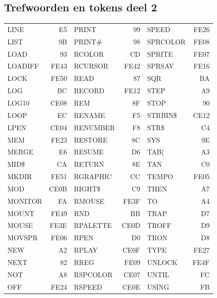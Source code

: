 \subsection{Trefwoorden en tokens deel 2}
{\ttfamily
\setlength{\tabcolsep}{1mm}
\begin{center}
\begin{tabular}{|p{2.2cm}r|p{2.2cm}r|p{2.2cm}r|}
\hline
LINE       &   E5 & PRINT      &   99 & SPEED      & FE26 \\
LIST       &   9B & PRINT\#    &   98 & SPRCOLOR   & FE08 \\
LOAD       &   93 & RCOLOR     &   CD & SPRITE     & FE07 \\
LOADIFF    & FE43 & RCURSOR    & FE42 & SPRSAV     & FE16 \\
LOCK       & FE50 & READ       &   87 & SQR        &   BA \\
LOG        &   BC & RECORD     & FE12 & STEP       &   A9 \\
LOG10      & CE08 & REM        &   8F & STOP       &   90 \\
LOOP       &   EC & RENAME     &   F5 & STRBIN\$   & CE12 \\
LPEN       & CE04 & RENUMBER   &   F8 & STR\$      &   C4 \\
MEM        & FE23 & RESTORE    &   8C & SYS        &   9E \\
MERGE      &   E6 & RESUME     &   D6 & TAB(       &   A3 \\
MID\$      &   CA & RETURN     &   8E & TAN        &   C0 \\
MKDIR      & FE51 & RGRAPHIC   &   CC & TEMPO      & FE05 \\
MOD        & CE0B & RIGHT\$    &   C9 & THEN       &   A7 \\
MONITOR    &   FA & RMOUSE     & FE3F & TO         &   A4 \\
MOUNT      & FE49 & RND        &   BB & TRAP       &   D7 \\
MOUSE      & FE3E & RPALETTE   & CE0D & TROFF      &   D9 \\
MOVSPR     & FE06 & RPEN       &   D0 & TRON       &   D8 \\
NEW        &   A2 & RPLAY      & CE0F & TYPE       & FE27 \\
NEXT       &   82 & RREG       & FE09 & UNLOCK     & FE4F \\
NOT        &   A8 & RSPCOLOR   & CE07 & UNTIL      &   FC \\
OFF        & FE24 & RSPEED     & CE0E & USING      &   FB \\

\end{tabular}
\end{center}}
